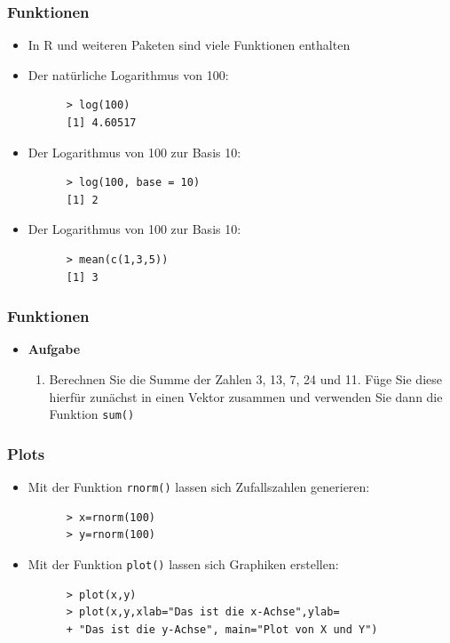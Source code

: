 \documentclass{beamer}
\begin{document}
\begin{frame}[fragile]
  \frametitle{Funktionen}
  \begin{itemize}
    \item In R und weiteren Paketen sind viele Funktionen enthalten
    \item Der natürliche Logarithmus von 100:    
    \begin{Verbatim}
      > log(100)
      [1] 4.60517
    \end{Verbatim}    
    \item Der Logarithmus von 100 zur Basis 10:    
    \begin{Verbatim}
      > log(100, base = 10)
      [1] 2
    \end{Verbatim}
   \item Der Logarithmus von 100 zur Basis 10:    
    \begin{Verbatim}
      > mean(c(1,3,5))
      [1] 3
    \end{Verbatim}
  \end{itemize}
\end{frame}

\begin{frame}[fragile]
  \frametitle{Funktionen}
  \begin{itemize}
    \item \textbf{Aufgabe} \\ 
         \begin{enumerate}
      		\item Berechnen Sie die Summe der Zahlen 3, 13, 7, 24 und 11. Füge Sie diese hierfür zunächst in einen Vektor zusammen und verwenden Sie dann die Funktion \Verb+sum()+
    \end{enumerate}
  \end{itemize}
\end{frame}

\begin{frame}[fragile]
  \frametitle{Plots}
  \begin{itemize}
    \item Mit der Funktion \Verb+rnorm()+ lassen sich Zufallszahlen generieren:    
    \begin{Verbatim}
      > x=rnorm(100)
      > y=rnorm(100)
         \end{Verbatim}    
    \item Mit der Funktion \Verb+plot()+ lassen sich Graphiken erstellen:    
    \begin{Verbatim}
      > plot(x,y)
      > plot(x,y,xlab="Das ist die x-Achse",ylab=
      + "Das ist die y-Achse", main="Plot von X und Y")
    \end{Verbatim}       
  \end{itemize}
\end{frame}
\end{document}
